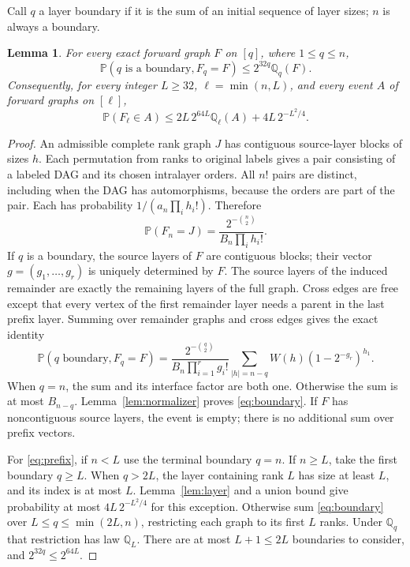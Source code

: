 \documentclass[11pt]{article}
\newtheorem{lemma}[theorem]{Lemma}
\theoremstyle{remark}
\newcommand{\Prob}{\mathbb P}
\newcommand{\Q}{\mathbb Q}
\begin{document}
Call $q$ a layer boundary if it is the sum of an initial sequence of layer
sizes; $n$ is always a boundary.
\begin{lemma}\label{lem:prefix}
For every exact forward graph $F$ on $[q]$, where $1\le q\le n$,
\begin{equation}\label{eq:boundary}
 \Prob(q\text{ is a boundary},F_q=F)\le2^{32q}\Q_q(F).
\end{equation}
Consequently, for every integer $L\ge32$, $\ell=\min(n,L)$, and every
event $A$ of forward graphs on $[\ell]$,
\begin{equation}\label{eq:prefix}
 \Prob(F_\ell\in A)
 \le2L\,2^{64L}\Q_\ell(A)+4L\,2^{-L^2/4}.
\end{equation}
\end{lemma}
\begin{proof}
An admissible complete rank graph $J$ has contiguous source-layer blocks of
sizes $h$. Each permutation from ranks to original labels gives a pair
consisting of a labeled DAG and its chosen intralayer orders. All $n!$ pairs
are distinct, including when the DAG has automorphisms, because the orders
are part of the pair. Each has probability $1/(a_n\prod_i h_i!)$. Therefore
\[
 \Prob(F_n=J)=\frac{2^{-\binom n2}}{B_n\prod_i h_i!}.
\]
If $q$ is a boundary, the source layers of $F$ are contiguous blocks;
their vector $g=(g_1,\ldots,g_r)$ is uniquely determined by $F$.
The source layers of the induced remainder are exactly the remaining
layers of the full graph. Cross edges are free except that every vertex of
the first remainder layer needs a parent in the last prefix layer. Summing
over remainder graphs and cross edges gives the exact identity
\begin{equation}\label{eq:exactprefix}
 \Prob(q\text{ boundary},F_q=F)
 =\frac{2^{-\binom q2}}{B_n\prod_{i=1}^r g_i!}
   \sum_{|h|=n-q}W(h)(1-2^{-g_r})^{h_1}.
\end{equation}
When $q=n$, the sum and its interface factor are both one. Otherwise the
sum is at most $B_{n-q}$. Lemma~\ref{lem:normalizer} proves
\eqref{eq:boundary}. If $F$ has noncontiguous source layers, the event is
empty; there is no additional sum over prefix vectors.

For \eqref{eq:prefix}, if $n<L$ use the terminal boundary $q=n$.
If $n\ge L$, take the first boundary $q\ge L$. When $q>2L$, the layer
containing rank $L$ has size at least $L$, and its index is at most $L$.
Lemma~\ref{lem:layer} and a union bound give probability at most
$4L\,2^{-L^2/4}$ for this exception. Otherwise sum
\eqref{eq:boundary} over $L\le q\le\min(2L,n)$, restricting each graph
to its first $L$ ranks. Under $\Q_q$ that restriction has law $\Q_L$.
There are at most $L+1\le2L$ boundaries to consider, and
$2^{32q}\le2^{64L}$.
\end{proof}
\end{document}
